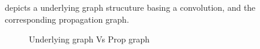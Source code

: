  depicts a underlying graph strucuture basing a convolution, and the corresponding propagation graph.

\begin{figure}[H]
\centering
{}
\caption{Underlying graph Vs Prop graph}
\label{fig:upgraph}
\end{figure}